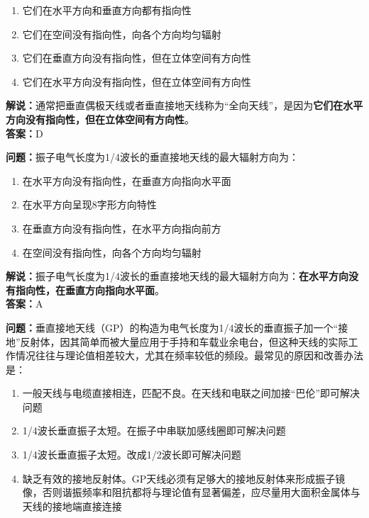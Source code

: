 \documentclass{ctexbook}
\begin{document}
\begin{enumerate}[label=\Alph*), leftmargin=3em]
	\item 它们在水平方向和垂直方向都有指向性
	\item 它们在空间没有指向性，向各个方向均匀辐射
	\item 它们在垂直方向没有指向性，但在立体空间有方向性
	\item 它们在水平方向没有指向性，但在立体空间有方向性
\end{enumerate}

\noindent\textbf{解说：}通常把垂直偶极天线或者垂直接地天线称为“全向天线”，是因为\textbf{它们在水平方向没有指向性，但在立体空间有方向性}。\\\noindent\textbf{答案：}D%


\bigskip


\noindent\textbf{问题：}振子电气长度为1/4波长的垂直接地天线的最大辐射方向为：

\begin{enumerate}[label=\Alph*), leftmargin=3em]
	\item 在水平方向没有指向性，在垂直方向指向水平面
	\item 在水平方向呈现8字形方向特性
	\item 在垂直方向没有指向性，在水平方向指向前方
	\item 在空间没有指向性，向各个方向均匀辐射
\end{enumerate}

\noindent\textbf{解说：}振子电气长度为1/4波长的垂直接地天线的最大辐射方向为：\textbf{在水平方向没有指向性，在垂直方向指向水平面}。\\\noindent\textbf{答案：}A%


\bigskip


\noindent\textbf{问题：}垂直接地天线（GP）的构造为电气长度为1/4波长的垂直振子加一个“接地”反射体，因其简单而被大量应用于手持和车载业余电台，但这种天线的实际工作情况往往与理论值相差较大，尤其在频率较低的频段。最常见的原因和改善办法是：

\begin{enumerate}[label=\Alph*), leftmargin=3em]
	\item 一般天线与电缆直接相连，匹配不良。在天线和电联之间加接“巴伦”即可解决问题
	\item 1/4波长垂直振子太短。在振子中串联加感线圈即可解决问题
	\item 1/4波长垂直振子太短。改成1/2波长即可解决问题
	\item 缺乏有效的接地反射体。GP天线必须有足够大的接地反射体来形成振子镜像，否则谐振频率和阻抗都将与理论值有显著偏差，应尽量用大面积金属体与天线的接地端直接连接
\end{enumerate}
\end{document}
